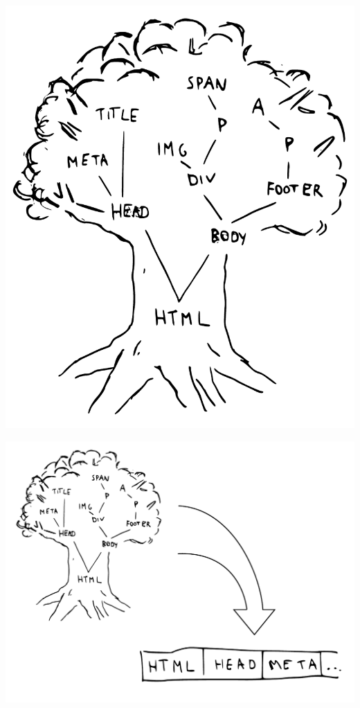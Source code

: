 \documentclass[20pt]{beamer}
\begin{document}
\begin{frame}[plain]
    \begin{center}
    \includegraphics[height=1.0\textheight]{images/html-tree.pdf}
    \end{center}
\end{frame}

\begin{frame}[plain]
    \begin{center}
    \includegraphics[width=1.0\textwidth]{images/flatten.pdf}
    \end{center}
\end{frame}
\end{document}

